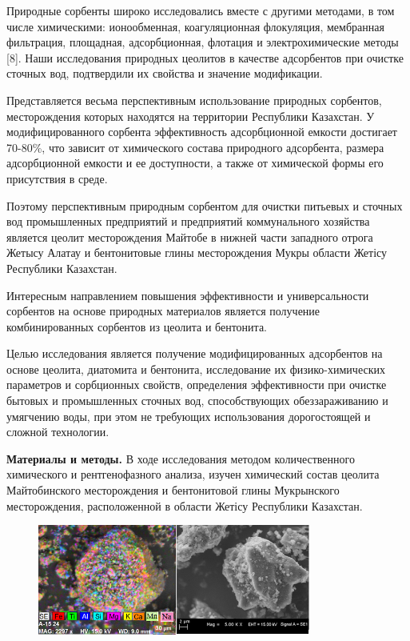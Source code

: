 Природные сорбенты широко исследовались вместе с другими методами, в том
числе химическими: ионообменная, коагуляционная флокуляция, мембранная
фильтрация, площадная, адсорбционная, флотация и электрохимические
методы {[}8{]}. Наши исследования природных цеолитов в качестве
адсорбентов при очистке сточных вод, подтвердили их свойства и значение
модификации.

Представляется весьма перспективным использование природных сорбентов,
месторождения которых находятся на территории Республики Казахстан. У
модифицированного сорбента эффективность адсорбционной емкости достигает
70-80\%, что зависит от химического состава природного адсорбента,
размера адсорбционной емкости и ее доступности, а также от химической
формы его присутствия в среде.

Поэтому перспективным природным сорбентом для очистки питьевых и сточных
вод промышленных предприятий и предприятий коммунального хозяйства
является цеолит месторождения Майтобе в нижней части западного отрога
Жетысу Алатау и бентонитовые глины месторождения Мукры области Жетісу
Республики Казахстан.

Интересным направлением повышения эффективности и универсальности
сорбентов на основе природных материалов является получение
комбинированных сорбентов из цеолита и бентонита.

Целью исследования является получение модифицированных адсорбентов на
основе цеолита, диатомита и бентонита, исследование их физико-химических
параметров и сорбционных свойств, определения эффективности при очистке
бытовых и промышленных сточных вод, способствующих обеззараживанию и
умягчению воды, при этом не требующих использования дорогостоящей и
сложной технологии.

{\bfseries Материалы и методы.} В ходе исследования методом количественного
химического и рентгенофазного анализа, изучен химический состав цеолита
Майтобинского месторождения и бентонитовой глины Мукрынского
месторождения, расположенной в области Жетісу Республики Казахстан.

\begin{figure}[H]
	\centering
	\includegraphics[width=0.8\textwidth]{media/chem/image1}
	\caption*{}
\end{figure}



